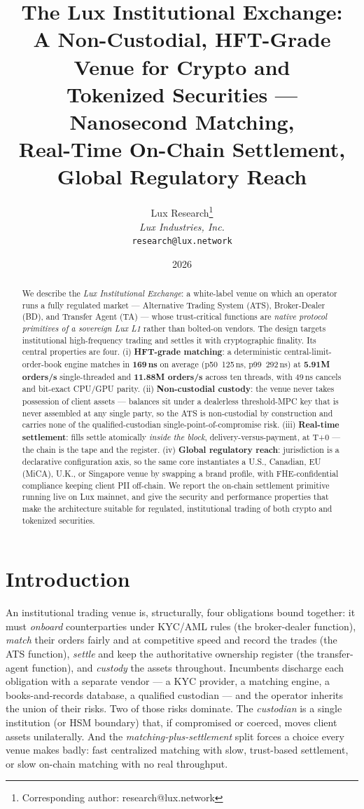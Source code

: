 \documentclass[11pt,a4paper]{article}
\title{The Lux Institutional Exchange:\\A Non-Custodial, HFT-Grade Venue for Crypto and\\
Tokenized Securities --- Nanosecond Matching,\\Real-Time On-Chain Settlement, Global Regulatory Reach}
\author{
Lux Research\thanks{Corresponding author: research@lux.network}\\
\textit{Lux Industries, Inc.}\\
\texttt{research@lux.network}
}
\date{2026}
\begin{document}
\luxcoverpage

\begin{abstract}
We describe the \emph{Lux Institutional Exchange}: a white-label venue on
which an operator runs a fully regulated market --- Alternative Trading
System (ATS), Broker-Dealer (BD), and Transfer Agent (TA) --- whose
trust-critical functions are \emph{native protocol primitives of a sovereign
Lux L1} rather than bolted-on vendors. The design targets institutional
high-frequency trading and settles it with cryptographic finality. Its
central properties are four. (i) \textbf{HFT-grade matching}: a deterministic
central-limit-order-book engine matches in \textbf{169\,ns} on average
(p50~125\,ns, p99~292\,ns) at \textbf{5.91M orders/s} single-threaded and
\textbf{11.88M orders/s} across ten threads, with 49\,ns cancels and
bit-exact CPU/GPU parity. (ii) \textbf{Non-custodial custody}: the venue
never takes possession of client assets --- balances sit under a dealerless
threshold-MPC key that is never assembled at any single party, so the ATS is
non-custodial by construction and carries none of the qualified-custodian
single-point-of-compromise risk. (iii) \textbf{Real-time settlement}: fills
settle atomically \emph{inside the block}, delivery-versus-payment, at T+0 ---
the chain is the tape and the register. (iv) \textbf{Global regulatory
reach}: jurisdiction is a declarative configuration axis, so the same core
instantiates a U.S., Canadian, EU (MiCA), U.K., or Singapore venue by
swapping a brand profile, with FHE-confidential compliance keeping client PII
off-chain. We report the on-chain settlement primitive running live on Lux
mainnet, and give the security and performance properties that make the
architecture suitable for regulated, institutional trading of both crypto and
tokenized securities.
\end{abstract}

\tableofcontents

\section{Introduction}

An institutional trading venue is, structurally, four obligations bound
together: it must \emph{onboard} counterparties under KYC/AML rules (the
broker-dealer function), \emph{match} their orders fairly and at competitive
speed and record the trades (the ATS function), \emph{settle} and keep the
authoritative ownership register (the transfer-agent function), and
\emph{custody} the assets throughout. Incumbents discharge each obligation
with a separate vendor --- a KYC provider, a matching engine, a
books-and-records database, a qualified custodian --- and the operator
inherits the union of their risks. Two of those risks dominate. The
\emph{custodian} is a single institution (or HSM boundary) that, if
compromised or coerced, moves client assets unilaterally. And the
\emph{matching-plus-settlement} split forces a choice every venue makes
badly: fast centralized matching with slow, trust-based settlement, or slow
on-chain matching with no real throughput.
\end{document}
